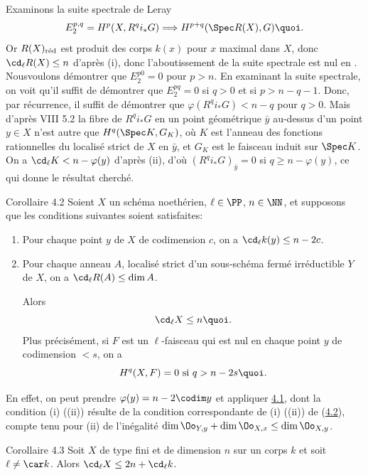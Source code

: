 \documentclass[10pt]{../fichiers-configuration-latex/smfart}
\begin{document}
Examinons la suite spectrale de Leray
$$
E^{p,q}_2=H^p(X,R^qi_{\ast}G)\Longrightarrow H^{p+q}(\Spec
R(X),G){\quoi}.
$$
Or $R(X)_{\text{\rm réd}}$ est produit des corps $k(x)$ pour $x$
maximal dans $X$, donc $\cd_{\ell}R(X)\leq n$ d'après (i), donc
l'aboutissement de la suite spectrale est nul en .
Nous\pageoriginale voulons démontrer que $E^{p0}_2=0$ pour $p>n$. En
examinant la suite spectrale, on voit qu'il suffit de démontrer que
$E^{pq}_2=0$ si $q>0$ et si $p>n-q-1$. Donc, par récurrence, il suffit
de démontrer que $\varphi(R^qi_{\ast}G)<n-q$ pour $q>0$. Mais d'après
VIII 5.2 la fibre de $R^qi_{\ast}G$ en un point géométrique $\bar{y}$
au-dessus d'un point $y\in X$ n'est autre que $H^q(\Spec K, G_K)$, où
$K$ est l'anneau des fonctions rationnelles du localisé strict de $X$
en $\bar{y}$, et $G_K$ est le faisceau induit sur $\Spec K$. On a
$\cd_{\ell}K<n-\varphi(y)$ d'après (ii), d'où
$(R^qi_{\ast}G)_{\bar{y}}=0$ si $q\geq n-\varphi(y)$, ce qui donne le
résultat cherché.

\begin{enonce*}{Corollaire 4.2}
Soient $X$ un schéma noethérien, $\ell\in \PP$,
$n\in \NN$, et supposons que les conditions
suivantes soient satisfaites:
\begin{enumerate}
\renewcommand{\theenumi}{\roman{enumi}}
\renewcommand{\labelenumi}{(\theenumi)}
\item Pour chaque point $y$ de $X$ de codimension $c$, on a
  $\cd_{\ell}k(y)\leq n-2c$.

\item Pour chaque anneau $A$, localisé strict d'un sous-schéma fermé
  irréductible $Y$ de $X$, on a $\cd_{\ell}R(A)\leq \dim A$.

Alors
$$
\cd_{\ell}X\leq n{\quoi}.
$$
Plus précisément, si $F$ est un $\ell$-faisceau qui est nul en chaque
point $y$ de codimension $<s$, on a
$$
H^q(X,F)=0\mbox{ si } q>n-2s{\quoi}.
$$
\end{enumerate}
\end{enonce*}

En effet, on peut prendre $\varphi(y)=n-2\codim y$ et appliquer \hyperref[X.thm4.1]{4.1},
dont la condition (i) (\resp (ii)) résulte de la condition
correspondante de (i) (\resp (ii)) de (\hyperref[X.cor4.2]{4.2}), compte tenu pour (ii) de
l'inégalité $\dim \Oo_{Y,y}+\dim \Oo_{X,x}\leq \dim \Oo_{X,y}$.

\begin{enonce*}{Corollaire 4.3}
Soit $X$ de type fini et de dimension $n$ sur un corps $k$ et soit
$\ell\neq \car k$. Alors $\cd_{\ell}X\leq 2n+\cd_{\ell}k$.
\end{enonce*}
\end{document}
